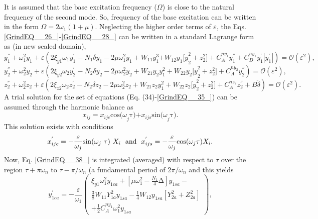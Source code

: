 \documentclass[review]{elsarticle}
\begin{document}
It is assumed that the base excitation frequency ($\Omega$) is close to the natural frequency of the second mode. So, frequency of the base excitation can be written in the form $\Omega=2{\omega}_1(1+\mu)$. Neglecting the higher order terms of $\varepsilon$, the Eqs. \eqref{GrindEQ__26_}-\eqref{GrindEQ__28_} can be written in a standard Lagrange form as (in new scaled domain),
\begin{equation} \label{GrindEQ__34_}
y^{''}_1+{\omega }^2_1y_1+\varepsilon \left(2{\xi }_{y1}{\omega }_1y^{'}_1-N_1\delta y_1-2\mu {\omega }^2_1y_1+W_{11}y^3_1{+W}_{12}{y_1[y}^2_2+z^2_2]+C^{ny_1}_Ay^{''}_1+C^{ny_1}_Dy^{'}_1\left|y^{'}_1\right|\right)=\mathcal{O}({\varepsilon }^2), 
\end{equation}
\begin{equation} \label{GrindEQ__35_}
y^{''}_2+{\omega }^2_2y_2+\varepsilon \left(2{\xi }_{y2}{\omega }_2y^{'}_2-N_2\delta y_2-2\mu {\omega }^2_2y_2+W_{21}y_2y^2_1+W_{22}{y_2[y}^2_2+z^2_2]+C^{ny_2}_Ay^{''}_2\right)=\mathcal{O}({\varepsilon }^2),
\end{equation}
\begin{equation} \label{GrindEQ__36_}
z^{''}_2+{\omega }^2_2z_2+\varepsilon \left(2{\xi }_{z2}{\omega }_2z^{'}_2-N_2\delta z_2-2\mu {\omega }^2_2z_2+W_{21}z_2y^2_1+W_{22}{z_2[y}^2_2+z^2_2]+C^{nz_2}_Az^{''}_2+B\ddot{\delta }\right)=\mathcal{O}({\varepsilon }^2).
\end{equation}
A trial solution for the set of equations (Eq. (34)-\eqref{GrindEQ__35_}) can be assumed through the harmonic balance as
\begin{equation} \label{GrindEQ__37_} 
x_{ij}=x_{ijc}\mathrm{cos} {(\omega }_j\mathrm{\tau }\mathrm{)}\mathrm{+}x_{ijs}\mathrm{sin} {(\omega }_j\mathrm{\tau}\mathrm{)}.            
\end{equation} 
This solution exists with conditions
\begin{equation} \label{GrindEQ__38_}
x^{'}_{ijc}=-\frac{\varepsilon }{{\omega }_j}{\mathrm{sin} ({\omega }_j\ }\tau\mathrm{)}\ X_i \hspace{1.5ex} \text{and} \hspace{1.5ex} x^{'}_{ijs}=-\frac{\varepsilon }{{\omega }_j}\mathrm{cos} ({\omega }_j\tau\mathrm{)} X_i.      
\end{equation}
Now, Eq. \eqref{GrindEQ__38_} is integrated (averaged) with respect to $\tau$ over the region $\tau+\pi\omega _n$ to $\tau-\pi/{\omega}_n$ (a fundamental period of $2\pi/\omega_n$ and this yields
\begin{equation} \label{GrindEQ__39_} 
y^{'}_{1ca}=-\frac{\varepsilon }{{\omega }_1}\left( \begin{array}{c}
{\xi }_{y1}{\omega }^2_1y_{1ca}+\left[\mu {\omega }^2_1-\frac{N_1}{4}\mathrm{\Delta }\right]y_{1sa}- \\ 
\frac{3}{8}W_{11}Y^2_{1a}y_{1sa}-\frac{1}{4}W_{12}y_{1sa}\left[Y^2_{2a}+Z^2_{2a}\right] \\ 
+\frac{1}{2}C^{ny_1}_A{\omega }^2_1y_{1sa} \end{array}
\right),         
\end{equation} 
\end{document}
